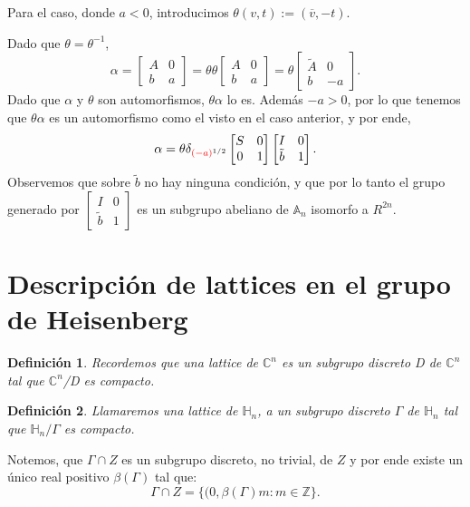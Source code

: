 \documentclass[12pt]{article}
\newtheorem{definition}{Definición}
\begin{document}
Para el caso, donde $a<0$, introducimos $\theta(v,t):=(\overline{v},-t)$.

Dado que $\theta=\theta^{-1}$,
$$\alpha=
\begin{bmatrix}
A & 0\\
b & a
\end{bmatrix}=
\theta 
\theta
\begin{bmatrix}
A & 0\\
b & a
\end{bmatrix}=
\theta
\begin{bmatrix}
\tilde{A} & 0\\
b & -a
\end{bmatrix}.
$$
Dado que $\alpha$ y $\theta$ son automorfismos, $\theta \alpha$ lo es. Además $-a>0$, por lo que tenemos que $\theta \alpha$ es 
un automorfismo como el visto en el caso anterior, y por ende,
$$\alpha=
\theta
\delta_{\textcolor{red}{(-a)}^{1/2}}
\begin{bmatrix}
S & 0\\
0 & 1
\end{bmatrix}
\begin{bmatrix}
I & 0\\
\tilde{b} & 1
\end{bmatrix}.
$$
Observemos que sobre $\tilde{b}$ no hay ninguna condición, y que por lo tanto el grupo generado por
$\begin{bmatrix}
I & 0\\
\tilde{b} & 1
\end{bmatrix}
$
es un subgrupo abeliano de $\mathbb{A}_n$ isomorfo a $R^{2n}$.

\section{Descripción de lattices en el grupo de Heisenberg}

\begin{definition}
 Recordemos que una lattice de $\mathbb{C}^n$ es un subgrupo discreto D de $\mathbb{C}^n$ tal que $\mathbb{C}^n$/D es compacto.
\end{definition}

\begin{definition}
 Llamaremos una lattice de $\mathbb{H}_n$, a un subgrupo discreto $\Gamma$ de $\mathbb{H}_n$ tal que $\mathbb{H}_n/\Gamma$ es compacto.
\end{definition}

Notemos, que  $\Gamma \cap Z$ es un subgrupo discreto, no trivial, de $Z$ y 
por ende existe un único real positivo $\beta(\Gamma)$ tal que:
$$
\Gamma \cap Z=\{(0,\beta(\Gamma) m : m \in \mathbb{Z}\}.
$$
\end{document}
